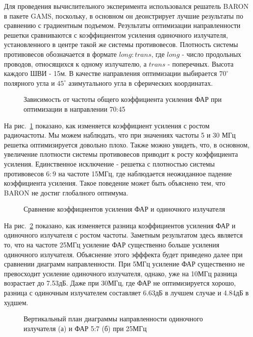 Для проведения вычислительного эксперимента использовался решатель BARON в пакете GAMS, поскольку, в основном он деонстрирует лучшие результаты по сравнению с градиентным подъемом. Результаты оптимизации направленности решетки сравниваются с коэффициентом усиления одиночного излучателя, установленного в центре такой же системы противовесов. Плотность системы противовесов обозначается в формате $long:trans$, где $long$ - число продольных проводов, относящихся к одному излучателю, а $trans$ - поперечных. Высота каждого ШВИ - 15м. В качестве направления оптимизации выбирается $70^{\circ}$ полярного угла и $45^{\circ}$ азимутального угла в сферических координатах.

\begin{figure}
\caption{Зависимость от частоты общего коэффициента усиления ФАР при оптимизации в направлении 70:45}
\label{ris:paa_gains}
\end{figure}

На рис.~\ref{ris:paa_gains} показано, как изменяется коэффициент усиления с ростом радиочастоты. Мы можем наблюдать, что при значениях частоты 5 и 30 МГц решетка оптимизируется довольно плохо. Также можно увидеть, что, в основном, увеличение плотности системы противовесов приводит к росту коэффициента усиления. Единственное исключение - решетка с плотностью системы противовесов $6:9$ на частоте 15МГц, где наблюдается неожиданное падение коэффициента усиления. Такое поведение может быть объяснено тем, что BARON не достиг глобалного оптимума.

\begin{figure}
\caption{Сравнение коэффициентов усиления ФАР и одиночного излучателя}
\label{ris:all_gains}
\end{figure}

На рис.~\ref{ris:all_gains} показано, как изменяется разница коэффициентов усиления ФАР и одиночного излучателя с ростом частоты. Заметным результатом здесь является то, что на частоте 25МГц усиление ФАР существенно больше усиления одиночного излучателя. Объяснение этого эфффекта будет приведено далее при сравнении диаграмм направленности. При 5МГц усиление ФАР существенно не превосходит усиление одиночного излучателя, однако, уже на 10МГц разница возрастает до 7.53дБ. Даже при 30МГц, где ФАР не оптимизируется хорошо, разница с одиночным излучателем составляет 6.63дБ в лучшем случае и 4.84дБ в худшем.

\begin{figure}
\begin{minipage}[h]{0.49\linewidth}
\end{minipage}
\hfill
\begin{minipage}[h]{0.49\linewidth}
\end{minipage}
\caption{Вертикальный план диаграммы направленности одиночного излучателя (а) и ФАР 5:7 (б) при 25МГц}
\label{ris:f25mhs}
\end{figure}

